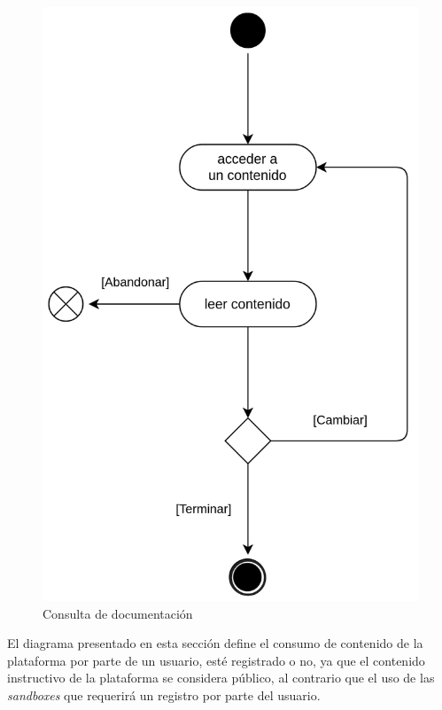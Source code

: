             \begin{figure}[h]
                \centering
                \includegraphics[scale=0.20]{images/Diagramas/Actividades y transiciones 3.png}
                \caption{Consulta de documentación}
                \label{fig:consulta-documentacion}
            \end{figure}
            
            El diagrama presentado en esta sección define el consumo de contenido de la plataforma por parte de un usuario, esté registrado o no, ya que el contenido instructivo de la plataforma se considera público, al contrario que el uso de las \textit{sandboxes} que requerirá un registro por parte del usuario.
            
